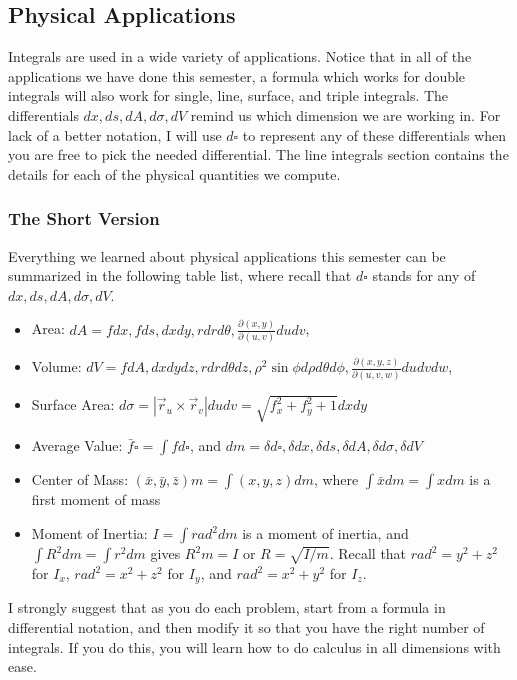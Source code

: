 \subsection{Physical Applications}
%
Integrals are used in a wide variety of applications.  Notice that in
all of the applications we have done this semester, a formula which
works for double integrals will also work for single, line, surface,
and triple integrals.  The differentials $dx,ds,dA,d\sigma, dV$ remind us
which dimension we are working in.  For lack of a better notation,  I
will use $d\square$ to represent any of these differentials when you
are free to pick the needed differential. The line integrals section
contains the details for each of the physical quantities we compute.


\subsubsection{The Short Version}
Everything we learned about physical applications this semester can be
summarized in the following table list, where recall that $d\square$
stands for any of $dx,ds,dA,d\sigma,dV$.
\begin{itemize}
\item Area: $dA = fdx,fds, dxdy, rdrd\theta, \frac{\partial(x,y)}{\partial(u,v)}dudv$, 
\item Volume: $dV = fdA,dxdydz, rdrd\theta dz, \rho^2\sin\phi d\rho d\theta d\phi,
\frac{\partial(x,y,z)}{\partial(u,v,w)}dudvdw$, 
\item Surface Area: $d\sigma = |\vec r_u\times \vec r_v|dudv =
\sqrt{f_x^2+f_y^2+1}dxdy$
\item Average Value: $\bar f\square = \int fd\square$, and $dm = \delta
d\square , \delta dx, \delta ds, \delta dA, \delta d\sigma, \delta dV $
\item Center of Mass: $(\bar x,\bar y,\bar z)m = \int(x,y,z) dm$, where
$\int \bar x dm = \int x dm$ is a first moment of mass
\item Moment of Inertia: $I = \int rad^2 dm$ is a moment of inertia, and
$\int R^2 dm = \int r^2 dm$ gives $R^2 m =I$ or $R=\sqrt{I/m}$. Recall that
$rad^2 = y^2+z^2$ for $I_x$, $rad^2=x^2+z^2$ for $I_y$, and
$rad^2=x^2+y^2$ for $I_z$.
\end{itemize}
I strongly suggest that as you do each problem, start from a formula
in differential notation, and then modify it so that you have the
right number of integrals.  If you do this, you will learn how to do
calculus in all dimensions with ease. 

